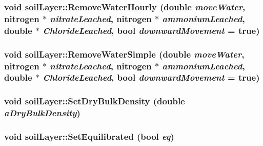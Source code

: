 \label{classsoil_layer_aa3c2588bb518594ccb63a7004bc823d4}
\hypertarget{classsoil_layer_a88b4d99d40dcc208f9a4c3776e85d130}{
\subsubsection[{RemoveWaterHourly}]{\setlength{\rightskip}{0pt plus 5cm}void soilLayer::RemoveWaterHourly (double {\em moveWater}, \/  {\bf nitrogen} $\ast$ {\em nitrateLeached}, \/  {\bf nitrogen} $\ast$ {\em ammoniumLeached}, \/  double $\ast$ {\em ChlorideLeached}, \/  bool {\em downwardMovement} = {\ttfamily true})}}
\label{classsoil_layer_a88b4d99d40dcc208f9a4c3776e85d130}
\hypertarget{classsoil_layer_a9ec6879510dcc7029c8f8450281688de}{
\subsubsection[{RemoveWaterSimple}]{\setlength{\rightskip}{0pt plus 5cm}void soilLayer::RemoveWaterSimple (double {\em moveWater}, \/  {\bf nitrogen} $\ast$ {\em nitrateLeached}, \/  {\bf nitrogen} $\ast$ {\em ammoniumLeached}, \/  double $\ast$ {\em ChlorideLeached}, \/  bool {\em downwardMovement} = {\ttfamily true})}}
\label{classsoil_layer_a9ec6879510dcc7029c8f8450281688de}
\hypertarget{classsoil_layer_ad1473f9c34f74acd1a7a73037d486b08}{
\subsubsection[{SetDryBulkDensity}]{\setlength{\rightskip}{0pt plus 5cm}void soilLayer::SetDryBulkDensity (double {\em aDryBulkDensity})}}
\label{classsoil_layer_ad1473f9c34f74acd1a7a73037d486b08}
\hypertarget{classsoil_layer_ac58f88c6110ed8e40e12dd469fca7600}{
\subsubsection[{SetEquilibrated}]{\setlength{\rightskip}{0pt plus 5cm}void soilLayer::SetEquilibrated (bool {\em eq})}}
